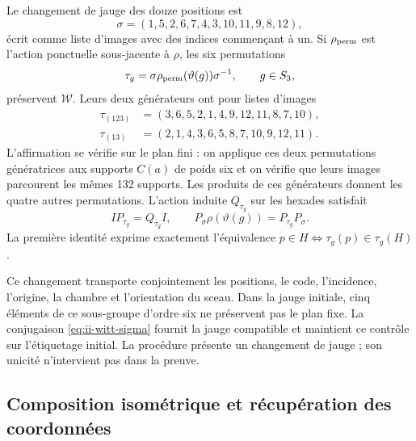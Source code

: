 Le changement de jauge des douze positions est
\begin{equation}
 \sigma=(1,5,2,6,7,4,3,10,11,9,8,12),
 \label{eq:ii-witt-sigma}
\end{equation}
écrit comme liste d’images avec des indices commençant à un. Si
\(\rho_{\rm perm}\) est l’action ponctuelle sous-jacente à \(\rho\), les
six permutations
\[
 \tau_g=\sigma\rho_{\rm perm}(\vartheta(g))\sigma^{-1},\qquad g\in S_3,
\]
préservent \(\mathcal W\). Leurs deux générateurs ont pour listes d’images
\[
\begin{aligned}
 \tau_{(123)}&=(3,6,5,2,1,4,9,12,11,8,7,10),\\
 \tau_{(13)}&=(2,1,4,3,6,5,8,7,10,9,12,11).
\end{aligned}
\]
L’affirmation se vérifie sur le plan fini : on applique ces deux
permutations génératrices aux supports
\(C(a)\) de poids six et on vérifie que leurs images parcourent les
mêmes 132 supports. Les produits de ces générateurs donnent les quatre
autres permutations. L’action induite \(Q_{\tau_g}\) sur les hexades
satisfait
\begin{equation}
 I P_{\tau_g}=Q_{\tau_g}I,
 \qquad
 P_\sigma\rho(\vartheta(g))=P_{\tau_g}P_\sigma.
 \label{eq:ii-witt-recalibration}
\end{equation}
La première identité exprime exactement l’équivalence
\(p\in H\Longleftrightarrow\tau_g(p)\in\tau_g(H)\).

Ce changement transporte conjointement les positions, le code, l’incidence,
l’origine, la chambre et l’orientation du sceau. Dans la jauge initiale, cinq
éléments de ce sous-groupe d’ordre six ne préservent pas le plan fixe.
La conjugaison \eqref{eq:ii-witt-sigma} fournit la jauge compatible
et maintient ce contrôle sur l’étiquetage initial. La procédure
présente un changement de jauge ; son unicité n’intervient pas dans la preuve.

\subsection{Composition isométrique et récupération des coordonnées}

